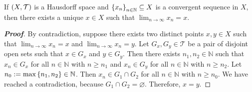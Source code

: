 \begin{proposition}
  If $\left(X,\mathcal{T}\right)$ is a Hausdorff space and $\left\{x_n\right\}_{n\in\mathbb{N}}\subseteq X$ is a convergent sequence in $X$, then there exists a unique $x\in X$ such that $\lim_{n\to\infty}{x_n}=x$.

  \begin{proof}[\rm\textbf{Proof}]
    By contradiction, suppose there exists two distinct points $x,y\in X$ such that $\lim_{n\to\infty}{x_n}=x$ and $\lim_{n\to\infty}{x_n}=y$. Let $G_x,G_y\in\mathcal{T}$ be a pair of disjoint open sets such that $x\in G_x$ and $y\in G_y$. Then there exists $n_1,n_2\in\mathbb{N}$ such that $x_n\in G_x$ for all $n\in\mathbb{N}$ with $n\geq n_1$ and $x_n\in G_y$ for all $n\in\mathbb{N}$ with $n\geq n_2$. Let $n_0:=\max\left\{n_1,n_2\right\}\in\mathbb{N}$. Then $x_n\in G_1\cap G_2$ for all $n\in\mathbb{N}$ with $n\geq n_0$. We have reached a contradiction, because $G_1\cap G_2=\varnothing$. Therefore, $x=y$.
  \end{proof}
\end{proposition}

